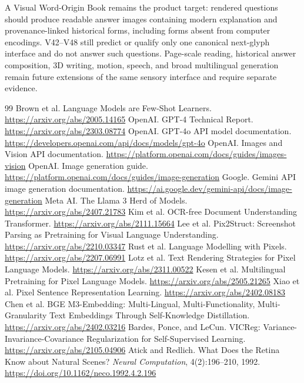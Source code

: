\documentclass[11pt]{article}
\begin{document}
A Visual Word-Origin Book remains the product target: rendered questions should
produce readable answer images containing modern explanation and
provenance-linked historical forms, including forms absent from computer
encodings. V42--V48 still predict or qualify only one canonical next-glyph
interface and do not answer such questions. Page-scale reading, historical
answer composition, 3D writing,
motion, speech, and broad multilingual generation remain future extensions of
the same sensory interface and require separate evidence.
\begin{thebibliography}{99}
 Brown et al. Language Models are Few-Shot Learners. \url{https://arxiv.org/abs/2005.14165}
 OpenAI. GPT-4 Technical Report. \url{https://arxiv.org/abs/2303.08774}
 OpenAI. GPT-4o API model documentation. \url{https://developers.openai.com/api/docs/models/gpt-4o}
 OpenAI. Images and Vision API documentation. \url{https://platform.openai.com/docs/guides/images-vision}
 OpenAI. Image generation guide. \url{https://platform.openai.com/docs/guides/image-generation}
 Google. Gemini API image generation documentation. \url{https://ai.google.dev/gemini-api/docs/image-generation}
 Meta AI. The Llama 3 Herd of Models. \url{https://arxiv.org/abs/2407.21783}
 Kim et al. OCR-free Document Understanding Transformer. \url{https://arxiv.org/abs/2111.15664}
 Lee et al. Pix2Struct: Screenshot Parsing as Pretraining for Visual Language Understanding. \url{https://arxiv.org/abs/2210.03347}
 Rust et al. Language Modelling with Pixels. \url{https://arxiv.org/abs/2207.06991}
 Lotz et al. Text Rendering Strategies for Pixel Language Models. \url{https://arxiv.org/abs/2311.00522}
 Kesen et al. Multilingual Pretraining for Pixel Language Models. \url{https://arxiv.org/abs/2505.21265}
 Xiao et al. Pixel Sentence Representation Learning. \url{https://arxiv.org/abs/2402.08183}
 Chen et al. BGE M3-Embedding: Multi-Lingual, Multi-Functionality, Multi-Granularity Text Embeddings Through Self-Knowledge Distillation. \url{https://arxiv.org/abs/2402.03216}
 Bardes, Ponce, and LeCun. VICReg: Variance-Invariance-Covariance Regularization for Self-Supervised Learning. \url{https://arxiv.org/abs/2105.04906}
 Atick and Redlich. What Does the Retina Know about Natural Scenes? \emph{Neural Computation}, 4(2):196--210, 1992. \url{https://doi.org/10.1162/neco.1992.4.2.196}

\end{thebibliography}
\end{document}
